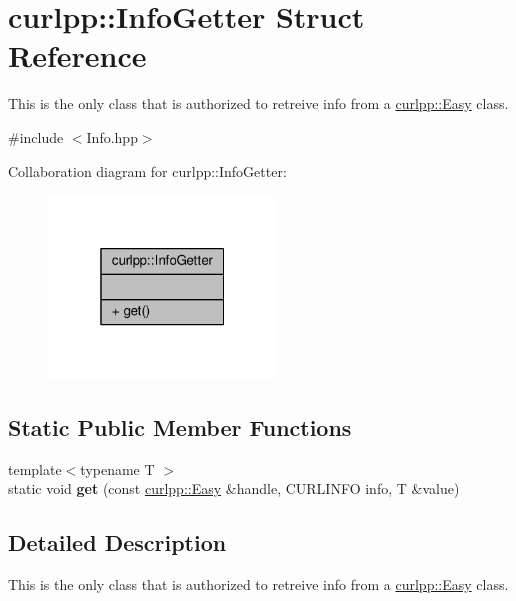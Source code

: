 \hypertarget{structcurlpp_1_1InfoGetter}{\section{curlpp\-:\-:Info\-Getter Struct Reference}
\label{structcurlpp_1_1InfoGetter}
}


This is the only class that is authorized to retreive info from a \hyperlink{classcurlpp_1_1Easy}{curlpp\-::\-Easy} class.  




{\ttfamily \#include $<$Info.\-hpp$>$}



Collaboration diagram for curlpp\-:\-:Info\-Getter\-:\nopagebreak
\begin{figure}[H]
\begin{center}
\leavevmode
\includegraphics[width=172pt]{structcurlpp_1_1InfoGetter__coll__graph}
\end{center}
\end{figure}
\subsection*{Static Public Member Functions}
\begin{DoxyCompactItemize}
\item 
\hypertarget{structcurlpp_1_1InfoGetter_af0ccdea821e69fcd8b989225a2fdc53e}{{\footnotesize template$<$typename T $>$ }\\static void {\bfseries get} (const \hyperlink{classcurlpp_1_1Easy}{curlpp\-::\-Easy} \&handle, C\-U\-R\-L\-I\-N\-F\-O info, T \&value)}\label{structcurlpp_1_1InfoGetter_af0ccdea821e69fcd8b989225a2fdc53e}

\end{DoxyCompactItemize}


\subsection{Detailed Description}
This is the only class that is authorized to retreive info from a \hyperlink{classcurlpp_1_1Easy}{curlpp\-::\-Easy} class. 

